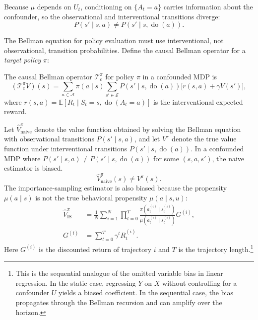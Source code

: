 Because $\mu$ depends on $U_t$, conditioning on $\{A_t = a\}$ carries information about the confounder, so the observational and interventional transitions diverge:
\begin{equation}
P(s' \mid s, a) \neq P(s' \mid s, \operatorname{do}(a)).
\label{eq:obs_vs_interventional}
\end{equation}

The Bellman equation for policy evaluation must use interventional, not observational, transition probabilities. Define the causal Bellman operator for a \textit{target policy} $\pi$:

\begin{definition}
\label{def:causal_bellman}
The causal Bellman operator $\mathcal{T}_c^\pi$ for policy $\pi$ in a confounded MDP is
\begin{equation}
(\mathcal{T}_c^\pi V)(s) = \sum_{a \in \mathcal{A}} \pi(a \mid s) \sum_{s' \in \mathcal{S}} P(s' \mid s, \operatorname{do}(a)) \bigl[ r(s, a) + \gamma V(s') \bigr],
\label{eq:causal_bellman}
\end{equation}
where $r(s,a) = \mathbb{E}[R_t \mid S_t = s, \operatorname{do}(A_t = a)]$ is the interventional expected reward.
\end{definition}

\begin{lemma}
\label{lem:naive_bias}
Let $\hat{V}^{\pi}_{\text{naive}}$ denote the value function obtained by solving the Bellman equation with observational transitions $P(s' \mid s, a)$, and let $V^\pi$ denote the true value function under interventional transitions $P(s' \mid s, \operatorname{do}(a))$. In a confounded MDP where $P(s' \mid s, a) \neq P(s' \mid s, \operatorname{do}(a))$ for some $(s, a, s')$, the naive estimator is biased.
\begin{equation}
\hat{V}^{\pi}_{\text{naive}}(s) \neq V^\pi(s).
\end{equation}
The importance-sampling estimator is also biased because the propensity $\mu(a \mid s)$ is not the true behavioral propensity $\mu(a \mid s, u)$:
\begin{align}
\hat{V}^{\pi}_{\text{IS}} &= \frac{1}{N} \sum_{i=1}^N
\prod_{t=0}^{T} \frac{\pi(a_t^{(i)} \mid s_t^{(i)})}{\mu(a_t^{(i)} \mid s_t^{(i)})} G^{(i)}, \\
G^{(i)} &= \sum_{t=0}^{T} \gamma^t R_t^{(i)}.
\end{align}
Here $G^{(i)}$ is the discounted return of trajectory $i$ and $T$ is the trajectory length.\footnote{This is the sequential analogue of the omitted variable bias in linear regression. In the static case, regressing $Y$ on $X$ without controlling for a confounder $U$ yields a biased coefficient. In the sequential case, the bias propagates through the Bellman recursion and can amplify over the horizon.}
\end{lemma}

